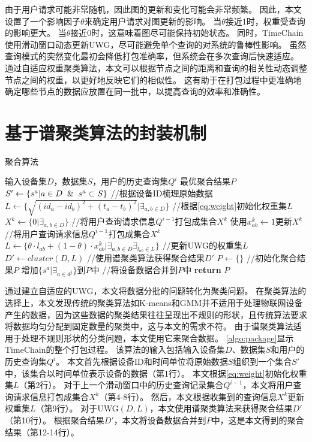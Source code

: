 由于用户请求可能非常随机，因此图的更新和变化可能会非常频繁。
因此，本文设置了一个影响因子$\theta$来确定用户请求对图更新的影响。
当$\theta$接近1时，权重受查询的影响更大。
当$\theta$接近0时，这意味着图尽可能保持初始状态。
同时，TimeChain使用滑动窗口动态更新UWG，尽可能避免单个查询的对系统的鲁棒性影响。
虽然查询模式的突然变化最初会降低打包准确率，但系统会在多次查询后快速适应。
通过自适应权重聚类算法，本文可以根据节点之间的距离和查询的相关性动态调整节点之间的权重，以更好地反映它们的相似性。
这有助于在打包过程中更准确地确定哪些节点的数据应放置在同一批中，以提高查询的效率和准确性。

\section{基于谱聚类算法的封装机制}
\label{sec:ratiocut}

\begin{algorithm}[t]
	\caption{聚合算法}
	\label{algo:package}
    \begin{algorithmic}[1]
        \REQUIRE 输入设备集$D$，数据集$S$，用户的历史查询集$Q^i$
        \ENSURE 最优聚合结果$P$
        \STATE $S' \gets \{s^a | a \in D \And s^a \subset S\}$ //根据设备ID梳理原始数据
        \STATE $L \gets \Big\{ \sqrt{ (id_a - id_b)^2 + (t_a - t_b)^2 } \Big| \exists_{a,b \in D} \Big\}$ //根据\autoref{eq:weight}初始化权重集$L$
        \STATE $X^k \gets \{0 | \exists_{a,b \in D} \}$ //将用户查询请求信息$Q^{i-1}$打包成集合$X^k$
                \STATE \textnormal{使用$x^k_{ab} \gets 1 $更新$X^k$} //将用户查询请求信息$Q^{i-1}$打包成集合$X^k$
            \ENDIF
        \ENDFOR
        \STATE $L \gets \Big\{ \theta \cdot l_{ab} + (1 - \theta) \cdot x_{ab}^k \Big| \exists_{a,b \in D} \exists_{l_{ab} \in L} \Big\}$ //更新UWG的权重集$L$
        \STATE $D' \gets \textit{cluster}(D, L)$ //使用谱聚类算法获得聚合结果$D'$
        \STATE $P \gets \{\}$ //初始化聚合结果$P$
            \STATE \textnormal{增加$\{ s^a | \exists_{a \in d^j} \}$到$P$中} //将设备数据合并到$P$中
        \ENDFOR
        \STATE \textbf{return} $P$
    \end{algorithmic}
\end{algorithm}

通过建立自适应的UWG，本文将数据分批的问题转化为聚类问题。
在聚类算法的选择上，本文发现传统的聚类算法如K-means和GMM并不适用于处理物联网设备产生的数据，因为这些数据的聚类结果往往呈现出不规则的形状，且传统算法要求将数据均匀分配到固定数量的聚类中，这与本文的需求不符。
由于谱聚类算法适用于处理不规则形状的分类问题，本文使用它来聚合数据。
\ref{algo:package}显示TimeChain的整个打包过程。
该算法的输入包括输入设备集$D$、数据集$S$和用户的历史查询集$Q^i$。
本文首先根据设备ID和时间单位将原始数据$S$组织到一个集合$S'$中，该集合以时间单位表示设备的数据（第1行）。
本文根据\autoref{eq:weight}初始化权重集$L$（第2行）。
对于上一个滑动窗口中的历史查询记录集合$Q^{i-1}$，本文将用户查询请求信息打包成集合$X^k$（第4-8行）。
然后，本文根据收集到的查询信息$X^k$更新权重集$L$（第9行）。
对于UWG$(D,L)$，本文使用谱聚类算法来获得聚合结果$D'$（第10行）。
根据聚合结果$D'$，本文将设备数据合并到$P$中，这是本文得到的聚合结果（第12-14行）。


